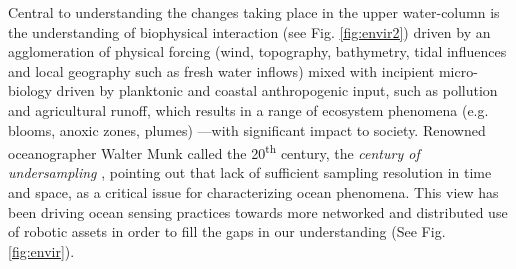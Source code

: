 \documentclass[aoas]{imsart}
\begin{document}
Central to understanding the changes taking place in the upper
water-column is the understanding of biophysical interaction (see Fig.
\ref{fig:envir2}) driven by an agglomeration of physical forcing (wind,
topography, bathymetry, tidal influences and local geography such as
fresh water inflows) mixed with incipient micro-biology driven by
planktonic and coastal anthropogenic input, such as pollution and
agricultural runoff, which results in a range of ecosystem phenomena
(e.g. blooms, anoxic zones, plumes) ---with significant impact to
society. Renowned oceanographer Walter Munk called the
20\textsuperscript{th} century, the \emph{century of undersampling}
\citep{munk2002}, pointing out that lack of sufficient sampling
resolution in time and space, %
as a critical issue for characterizing ocean phenomena. This view has
been driving ocean sensing practices towards more networked and
distributed use of robotic assets in order to fill the gaps in
our understanding (See Fig. \ref{fig:envir}).
\end{document}
